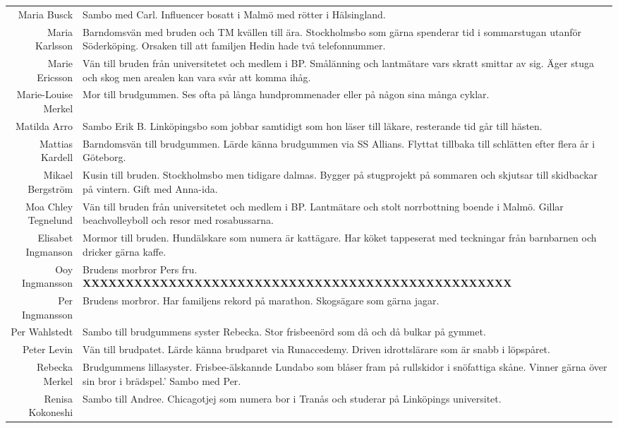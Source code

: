 \documentclass[a5paper]{article}
\begin{document}
\begin{longtable}[l]{N|L}
				Maria Busck	&	Sambo med Carl. Influencer bosatt i Malmö med rötter i Hälsingland. 	\\
				Maria Karlsson	&	Barndomsvän med bruden och TM kvällen till ära. Stockholmsbo som gärna spenderar tid i sommarstugan utanför Söderköping. Orsaken till att familjen Hedin hade två telefonnummer.	\\
				Marie Ericsson	&	Vän till bruden från universitetet och medlem i BP. Smålänning och lantmätare vars skratt smittar av sig. Äger stuga och skog men arealen kan vara svår att komma ihåg.	\\
				Marie-Louise Merkel	&	Mor till brudgummen. Ses ofta på långa hundprommenader eller på någon sina många cyklar.  	\\
				Matilda Arro	&	Sambo Erik B. Linköpingsbo som jobbar samtidigt som hon läser till läkare, resterande tid går till hästen. 	\\
				Mattias Kardell	&	Barndomsvän till brudgummen. Lärde känna brudgummen via SS Allians. Flyttat tillbaka till schlätten efter flera år i Göteborg.	\\
				Mikael Bergström	&	Kusin till bruden. Stockholmsbo men tidigare dalmas. Bygger på stugprojekt på sommaren och skjutsar till skidbackar på vintern. Gift med Anna-ida.	\\
				Moa Chley Tegnelund	&	Vän till bruden från universitetet och medlem i BP. Lantmätare och stolt norrbottning boende i Malmö. Gillar beachvolleyboll och resor med rosabussarna.  	\\
				Elisabet Ingmanson	&	Mormor till bruden. Hundälskare som numera är kattägare. Har köket tappeserat med teckningar från barnbarnen och dricker gärna kaffe.	\\
				Ooy Ingmansson	&	Brudens morbror Pers fru. \textbf{XXXXXXXXXXXXXXXXXXXXXXXXXXXXXXXXXXXXXXXXXXXXXXXXXX}	\\
				Per Ingmansson	&	Brudens morbror. Har familjens rekord på marathon. Skogsägare som gärna jagar. 	\\
				Per Wahlstedt	&	Sambo till brudgummens syster Rebecka. Stor frisbeenörd som då och då bulkar på gymmet. 	\\
				Peter Levin	&	Vän till brudpatet. Lärde känna brudparet via Runaccedemy. Driven idrottslärare som är snabb i löpspåret.	\\
				Rebecka Merkel	&	Brudgummens lillasyster. Frisbee-älskannde Lundabo som blåser fram på rullskidor i snöfattiga skåne. Vinner gärna över sin bror i brädspel.' Sambo med Per. 	\\
				Renisa Kokoneshi	&	Sambo till Andree. Chicagotjej som numera bor i Tranås och studerar på Linköpings universitet.	\\

\end{longtable}
\end{document}
